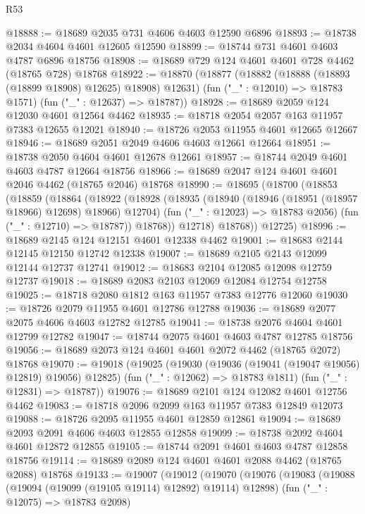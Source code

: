 \begin{lexlean}{R53}
\begin{coremodule}
@18888 := @18689 @2035 @731 @4606 @4603 @12590 @6896
@18893 := @18738 @2034 @4604 @4601 @12605 @12590
@18899 := @18744 @731 @4601 @4603 @4787 @6896 @18756
@18908 := @18689 @729 @124 @4601 @4601 @728 @4462 (@18765 @728) @18768
@18922 := @18870
    (@18877
      (@18882 (@18888 (@18893 (@18899 @18908) @12625) @18908) @12631)
      (fun ("_" : @12010) => @18783 @1571)
      (fun ("_" : @12637) => @18787))
@18928 := @18689 @2059 @124 @12030 @4601 @12564 @4462
@18935 := @18718 @2054 @2057 @163 @11957 @7383 @12655 @12021
@18940 := @18726 @2053 @11955 @4601 @12665 @12667
@18946 := @18689 @2051 @2049 @4606 @4603 @12661 @12664
@18951 := @18738 @2050 @4604 @4601 @12678 @12661
@18957 := @18744 @2049 @4601 @4603 @4787 @12664 @18756
@18966 := @18689 @2047 @124 @4601 @4601 @2046 @4462 (@18765 @2046) @18768
@18990 := @18695
    (@18700
      (@18853
        (@18859
          (@18864
            (@18922
              (@18928
                (@18935
                  (@18940 (@18946 (@18951 (@18957 @18966) @12698) @18966) @12704)
                  (fun ("_" : @12023) => @18783 @2056)
                  (fun ("_" : @12710) => @18787))
                @18768))
            @12718)
          @18768))
      @12725)
@18996 := @18689 @2145 @124 @12151 @4601 @12338 @4462
@19001 := @18683 @2144 @12145 @12150 @12742 @12338
@19007 := @18689 @2105 @2143 @12099 @12144 @12737 @12741
@19012 := @18683 @2104 @12085 @12098 @12759 @12737
@19018 := @18689 @2083 @2103 @12069 @12084 @12754 @12758
@19025 := @18718 @2080 @1812 @163 @11957 @7383 @12776 @12060
@19030 := @18726 @2079 @11955 @4601 @12786 @12788
@19036 := @18689 @2077 @2075 @4606 @4603 @12782 @12785
@19041 := @18738 @2076 @4604 @4601 @12799 @12782
@19047 := @18744 @2075 @4601 @4603 @4787 @12785 @18756
@19056 := @18689 @2073 @124 @4601 @4601 @2072 @4462 (@18765 @2072) @18768
@19070 := @19018
    (@19025
      (@19030 (@19036 (@19041 (@19047 @19056) @12819) @19056) @12825)
      (fun ("_" : @12062) => @18783 @1811)
      (fun ("_" : @12831) => @18787))
@19076 := @18689 @2101 @124 @12082 @4601 @12756 @4462
@19083 := @18718 @2096 @2099 @163 @11957 @7383 @12849 @12073
@19088 := @18726 @2095 @11955 @4601 @12859 @12861
@19094 := @18689 @2093 @2091 @4606 @4603 @12855 @12858
@19099 := @18738 @2092 @4604 @4601 @12872 @12855
@19105 := @18744 @2091 @4601 @4603 @4787 @12858 @18756
@19114 := @18689 @2089 @124 @4601 @4601 @2088 @4462 (@18765 @2088) @18768
@19133 := @19007
    (@19012
      (@19070
        (@19076
          (@19083
            (@19088 (@19094 (@19099 (@19105 @19114) @12892) @19114) @12898)
            (fun ("_" : @12075) => @18783 @2098)

\end{coremodule}
\end{lexlean}
